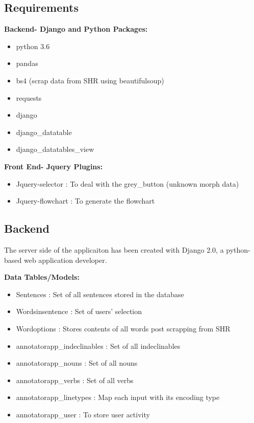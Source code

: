 \documentclass[12pt]{article}
\begin{document}
\subsection{Requirements}
\textbf{Backend- Django and Python Packages:}
\begin{itemize}
	\item python 3.6
	\item pandas
	\item bs4 (scrap data from SHR using beautifulsoup)
	\item requests
	\item django
	\item django\_datatable
	\item django\_datatables\_view
\end{itemize}
\textbf{Front End- Jquery Plugins:}
\begin{itemize}
	\item Jquery-selector : To deal with the grey\_button (unknown morph data)
	\item Jquery-flowchart : To generate the flowchart
\end{itemize}

\subsection{Backend}
The server side of the applicaiton has been created with Django 2.0, a python-based web application developer.

\textbf{Data Tables/Models:}
\begin{itemize}
	\item Sentences : Set of all sentences stored in the database
	\item Wordsinsentence : Set of users' selection
	\item Wordoptions : Stores contents of all words post scrapping from SHR
	\item annotatorapp\_indeclinables : Set of all indeclinables
	\item annotatorapp\_nouns : Set of all nouns
	\item annotatorapp\_verbs : Set of all verbs
	\item annotatorapp\_linetypes : Map each input with its encoding type
	\item annotatorapp\_user : To store user activity 
\end{itemize}
\end{document}
